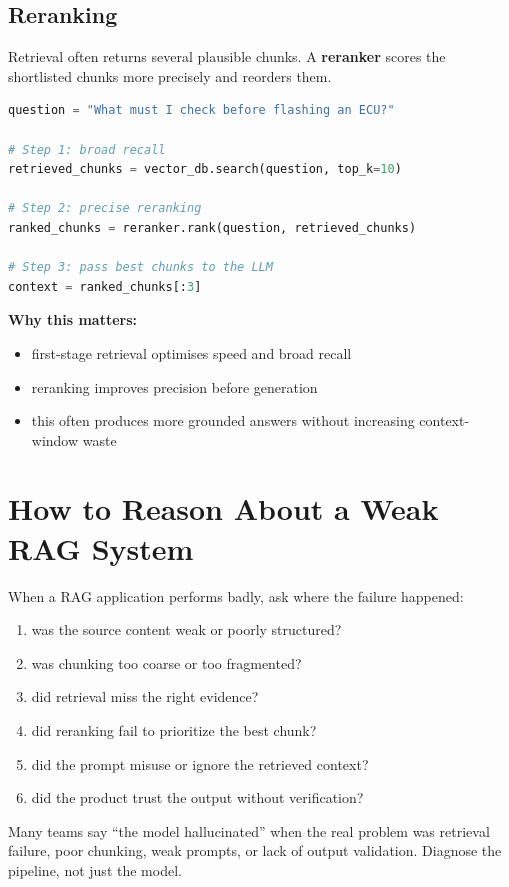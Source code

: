 \documentclass[12pt, a4paper, oneside]{book}
\begin{document}
\subsection{Reranking}
Retrieval often returns several plausible chunks. A \textbf{reranker} scores the shortlisted chunks more precisely and reorders them.

\begin{lstlisting}[language=Python, caption={Conceptual reranking flow}]
question = "What must I check before flashing an ECU?"

# Step 1: broad recall
retrieved_chunks = vector_db.search(question, top_k=10)

# Step 2: precise reranking
ranked_chunks = reranker.rank(question, retrieved_chunks)

# Step 3: pass best chunks to the LLM
context = ranked_chunks[:3]
\end{lstlisting}

\textbf{Why this matters:}
\begin{itemize}[leftmargin=2em]
    \item first-stage retrieval optimises speed and broad recall
    \item reranking improves precision before generation
    \item this often produces more grounded answers without increasing context-window waste
\end{itemize}

\section{How to Reason About a Weak RAG System}

When a RAG application performs badly, ask where the failure happened:
\begin{enumerate}[leftmargin=2em]
    \item was the source content weak or poorly structured?
    \item was chunking too coarse or too fragmented?
    \item did retrieval miss the right evidence?
    \item did reranking fail to prioritize the best chunk?
    \item did the prompt misuse or ignore the retrieved context?
    \item did the product trust the output without verification?
\end{enumerate}

\begin{warningbox}
Many teams say ``the model hallucinated'' when the real problem was retrieval failure, poor chunking, weak prompts, or lack of output validation. Diagnose the pipeline, not just the model.
\end{warningbox}
\end{document}
